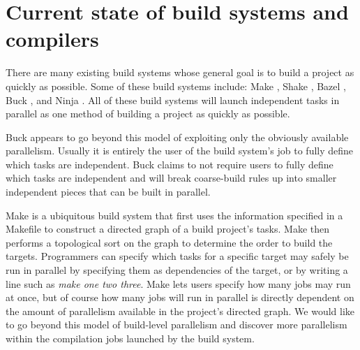 \documentclass[10pt]{article}
\begin{document}
\section{Current state of build systems and compilers}
\label{sec:state}


There are many existing build systems whose general goal is to build a project as quickly as
possible.  Some of these build systems include: Make \cite{feldman1979make}, Shake
\cite{mitchell2012shake}, Bazel \cite{bazel}, Buck \cite{buck}, and Ninja \cite{ninja}.
All of these build systems will launch independent tasks in parallel as one method of building a
project as quickly as possible.

Buck appears to go beyond this model of exploiting only the obviously available parallelism.  
Usually it is entirely the user of the build system's job to fully define which tasks are independent.
Buck claims to not require users to fully define which tasks are independent and will break coarse-build rules
up into smaller independent pieces that can be built in parallel.  

Make is a ubiquitous build system that first uses the information specified  in a
Makefile to construct a directed graph of a build project's tasks.  Make then performs a
topological sort on the graph to determine the order to build the targets.  Programmers can
specify which tasks
for a specific target may safely be run in parallel by specifying them as dependencies of the
target, or by writing a line such as \emph{make one two three}.  Make lets users specify how many
jobs may run at once, but of course how many jobs will run in parallel is directly dependent on the amount
of parallelism available in the project's directed graph.   We would like to go
beyond this model of build-level parallelism and discover more parallelism within the compilation jobs
launched by the build system.


\end{document}

